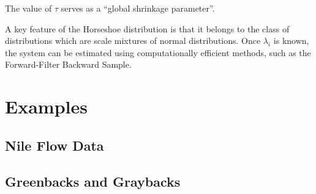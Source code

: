 \documentclass{article}
\begin{document}
The value of $\tau$ serves as a ``global shrinkage parameter''. 

A key feature of the Horseshoe distribution is that it belongs to the class of distributions which are scale mixtures of normal distributions. 
Once $\lambda_{i}$ is known, the system can be estimated using computationally efficient methods, such as the Forward-Filter Backward Sample.

\section{Examples}
\label{sec:examples}

\subsection{Nile Flow Data}
\label{sec:nile}

\subsection{Greenbacks and Graybacks}
\label{sec:greenbacks-graybacks}
\end{document}
